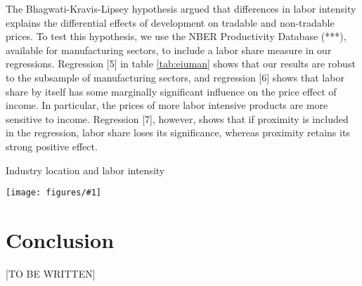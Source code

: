 \documentclass[12pt]{article}
\newcommand{\dotable}[2]{\begin{table}[h!]
\begin{centering}
\caption{#2\label{tab:#1}}
\texttt{[image: figures/\#1]}
\end{centering}
\end{table}}
\begin{document}
The Bhagwati-Kravis-Lipsey hypothesis argued that differences in labor intensity explains the differential effects of development on tradable and non-tradable prices. To test this hypothesis, we use the NBER Productivity Database (***), available for manufacturing sectors, to include a labor share measure in our regressions. Regression [5] in table \ref{tab:eiuman} shows that our results are robust to the subsample of manufacturing sectors, and regression [6] shows that labor share by itself has some marginally significant influence on the price effect of income. In particular, the prices of more labor intensive products are more sensitive to income. Regression [7], however, shows that if proximity is included in the regression, labor share loses its significance, whereas proximity retains its strong positive effect.

\dotable{eiuman}{Industry location and labor intensity}

\section{Conclusion}
[TO BE WRITTEN]
\end{document}
